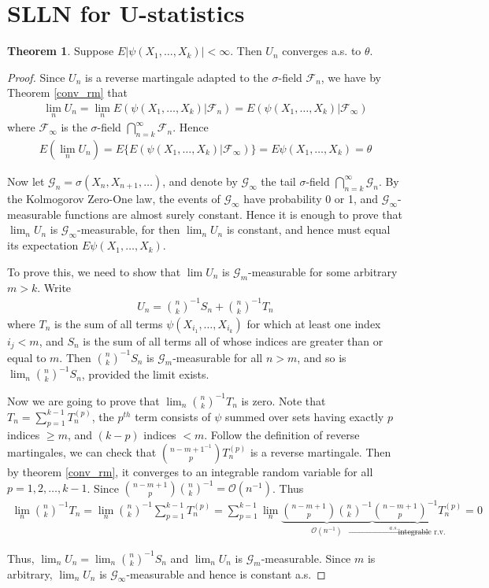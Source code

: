 \documentclass{article}
\theoremstyle{definition}
\newtheorem{theorem}{Theorem}
\numberwithin{Def}{section}
\begin{document}
\section{SLLN for U-statistics}
\begin{theorem}
Suppose $E|\psi(X_1, \dotsc,X_k)|<\infty$. Then $U_n$ converges a.s. to $\theta$.
\end{theorem}
\begin{proof}
Since $U_n$ is a reverse martingale adapted to the $\sigma$-field $\mathcal{F}_n$, we have by Theorem \ref{conv_rm} that 
\begin{align*}
\lim_n U_n = \lim_n E(\psi(X_1,\dotsc,X_k)|\mathcal{F}_n)=E(\psi(X_1,\dotsc,X_k)|\mathcal{F}_\infty)    
\end{align*}
where $\mathcal{F}_\infty$ is the $\sigma$-field $\bigcap_{n=k}^\infty \mathcal{F}_n$. Hence
\begin{align*}
E(\lim_n U_n)=E\{E(\psi(X_1,\dotsc,X_k)|\mathcal{F}_\infty)\}=E\psi(X_1, \dotsc,X_k)=\theta
\end{align*}

Now let $\mathcal{G}_n=\sigma(X_n,X_{n+1},\dotsc)$, and denote by $\mathcal{G}_\infty$ the tail $\sigma$-field $\bigcap_{n=k}^\infty \mathcal{G}_n$. By the Kolmogorov Zero-One law, the events of $\mathcal{G}_\infty$ have probability 0 or 1, and $\mathcal{G}_\infty$-measurable functions are almost surely constant. Hence it is enough to prove that $\lim_n U_n$ is $\mathcal{G}_\infty$-measurable, for then $\lim_n U_n$ is constant, and hence must equal its expectation $E\psi(X_1,\dotsc,X_k)$.

To prove this, we need to show that $\lim U_n$ is $\mathcal{G}_m$-measurable for some arbitrary $m>k$. Write
\begin{align*}
U_n={n\choose k}^{-1}S_n+{n\choose k}^{-1}T_n
\end{align*}
where $T_n$ is the sum of all terms $\psi(X_{i_1},\dotsc,X_{i_k})$ for which at least one index $i_j<m$, and $S_n$ is the sum of all terms all of whose indices are greater than or equal to $m$. Then ${n\choose k}^{-1}S_n$ is $\mathcal{G}_m$-measurable for all $n>m$, and so is $\lim_n {n \choose k}^{-1}S_n$, provided the limit exists.

Now we are going to prove that $\lim_n {n\choose k}^{-1}T_n$ is zero. Note that $T_n=\sum_{p=1}^{k-1}T_n^{(p)}$, the $p^{th}$ term consists of $\psi$ summed over sets having exactly $p$ indices $\ge m$, and $(k-p)$ indices $<m$. Follow the definition of reverse martingales, we can check that ${{n-m+1}^{-1}\choose p}T_n^{(p)}$ is a reverse martingale. Then by theorem \ref{conv_rm}, it converges to an integrable random variable for all $p=1,2,\dotsc,k-1$. Since ${{n-m+1}\choose p}{n\choose k}^{-1}=\mathcal{O}(n^{-1})$. Thus
\begin{align*}
\lim_n {n\choose k}^{-1} T_n=\lim_n {n\choose k}^{-1} \sum_{p=1}^{k-1}T_n^{(p)}=\sum_{p=1}^{k-1}\lim_n\underbrace{ {{n-m+1}\choose p}{n\choose k}^{-1}}_{\mathcal{O}(n^{-1})}\underbrace{{{n-m+1}\choose p}^{-1}T_n^{(p)}}_{\xrightarrow{a.s.}\text{integrable r.v.}}=0
\end{align*}

Thus, $\lim_n U_n=\lim_n{n\choose k}^{-1}S_n$ and $\lim_n U_n$ is $\mathcal{G}_m$-measurable. Since $m$ is arbitrary, $\lim_n U_n$ is $\mathcal{G}_\infty$-measurable and hence is constant a.s.
\end{proof}
\end{document}
